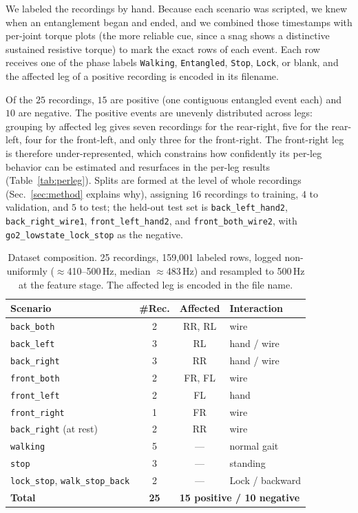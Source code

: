 \documentclass[conference]{IEEEtran}
\begin{document}
We labeled the recordings by hand. Because each scenario was scripted, we knew when an entanglement began and ended, and we combined those timestamps with per-joint torque plots (the more reliable cue, since a snag shows a distinctive sustained resistive torque) to mark the exact rows of each event. Each row receives one of the phase labels \texttt{Walking}, \texttt{Entangled}, \texttt{Stop}, \texttt{Lock}, or blank, and the affected leg of a positive recording is encoded in its filename.

Of the $25$ recordings, $15$ are positive (one contiguous entangled event each) and $10$ are negative. The positive events are unevenly distributed across legs: grouping by affected leg gives seven recordings for the rear-right, five for the rear-left, four for the front-left, and only three for the front-right. The front-right leg is therefore under-represented, which constrains how confidently its per-leg behavior can be estimated and resurfaces in the per-leg results (Table~\ref{tab:perleg}). Splits are formed at the level of whole recordings (Sec.~\ref{sec:method} explains why), assigning $16$ recordings to training, $4$ to validation, and $5$ to test; the held-out test set is \texttt{back\_left\_hand2}, \texttt{back\_right\_wire1}, \texttt{front\_left\_hand2}, and \texttt{front\_both\_wire2}, with \texttt{go2\_lowstate\_lock\_stop} as the negative.
\begin{table}[t]
\centering
\caption{Dataset composition. 25 recordings, 159{,}001 labeled rows, logged non-uniformly
($\approx$410--500\,Hz, median $\approx$483\,Hz) and resampled to 500\,Hz at the feature stage. The
affected leg is encoded in the file name.}
\label{tab:dataset}
\footnotesize
\begin{tabular}{@{}lccl@{}}
\toprule
Scenario & \#Rec. & Affected & Interaction \\
\midrule
\texttt{back\_both}  & 2 & RR, RL & wire \\
\texttt{back\_left}  & 3 & RL     & hand / wire \\
\texttt{back\_right} & 3 & RR     & hand / wire \\
\texttt{front\_both} & 2 & FR, FL & wire \\
\texttt{front\_left} & 2 & FL     & hand \\
\texttt{front\_right}& 1 & FR     & wire \\
\texttt{back\_right} (at rest) & 2 & RR & wire \\
\midrule
\texttt{walking} & 5 & --- & normal gait \\
\texttt{stop}    & 3 & --- & standing \\
\texttt{lock\_stop}, \texttt{walk\_stop\_back} & 2 & --- & Lock / backward \\
\midrule
\textbf{Total} & \textbf{25} & \multicolumn{2}{l}{\textbf{15 positive / 10 negative}} \\
\bottomrule
\end{tabular}
\end{table}
\end{document}
